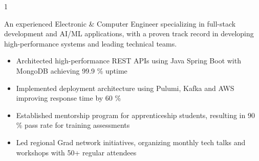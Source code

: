 \documentclass[11pt,a4paper,ragged2e]{altacv}
\begin{document}
\begin{paracol}{1}
\smallskip
{}

An experienced Electronic \& Computer Engineer specializing in full-stack development and AI/ML applications, with a proven track record in developing high-performance systems and leading technical teams. \smallskip



\begin{itemize}
\item Architected high-performance REST APIs using Java Spring Boot with MongoDB achieving 99.9 \% uptime 
\item Implemented deployment architecture using Pulumi, Kafka and AWS improving response time by 60 \% 
\item Established mentorship program for apprenticeship students, resulting in 90 \% pass rate for training assessments
\item Led regional Grad network initiatives, organizing monthly tech talks and workshops with 50+ regular attendees
\end{itemize}
\tightdivider



\end{paracol}
\end{document}
